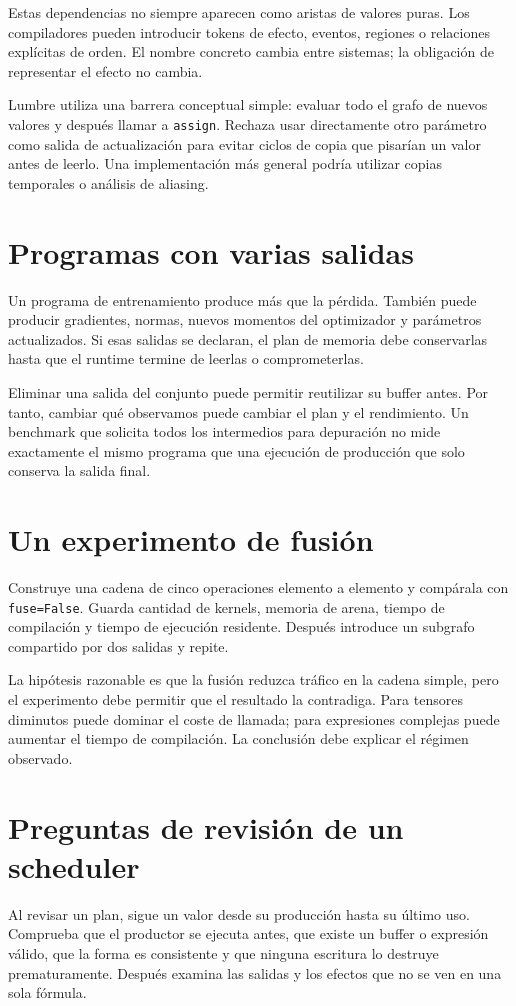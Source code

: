 \documentclass[12pt,a4paper,oneside]{report}
\begin{document}
Estas dependencias no siempre aparecen como aristas de valores puras. Los compiladores pueden introducir tokens de efecto, eventos, regiones o relaciones explícitas de orden. El nombre concreto cambia entre sistemas; la obligación de representar el efecto no cambia.

Lumbre utiliza una barrera conceptual simple: evaluar todo el grafo de nuevos valores y después llamar a \texttt{assign}. Rechaza usar directamente otro parámetro como salida de actualización para evitar ciclos de copia que pisarían un valor antes de leerlo. Una implementación más general podría utilizar copias temporales o análisis de aliasing.

\section{Programas con varias salidas}
Un programa de entrenamiento produce más que la pérdida. También puede producir gradientes, normas, nuevos momentos del optimizador y parámetros actualizados. Si esas salidas se declaran, el plan de memoria debe conservarlas hasta que el runtime termine de leerlas o comprometerlas.

Eliminar una salida del conjunto puede permitir reutilizar su buffer antes. Por tanto, cambiar qué observamos puede cambiar el plan y el rendimiento. Un benchmark que solicita todos los intermedios para depuración no mide exactamente el mismo programa que una ejecución de producción que solo conserva la salida final.

\section{Un experimento de fusión}
Construye una cadena de cinco operaciones elemento a elemento y compárala con \texttt{fuse=False}. Guarda cantidad de kernels, memoria de arena, tiempo de compilación y tiempo de ejecución residente. Después introduce un subgrafo compartido por dos salidas y repite.

La hipótesis razonable es que la fusión reduzca tráfico en la cadena simple, pero el experimento debe permitir que el resultado la contradiga. Para tensores diminutos puede dominar el coste de llamada; para expresiones complejas puede aumentar el tiempo de compilación. La conclusión debe explicar el régimen observado.

\section{Preguntas de revisión de un scheduler}
Al revisar un plan, sigue un valor desde su producción hasta su último uso. Comprueba que el productor se ejecuta antes, que existe un buffer o expresión válido, que la forma es consistente y que ninguna escritura lo destruye prematuramente. Después examina las salidas y los efectos que no se ven en una sola fórmula.
\end{document}
